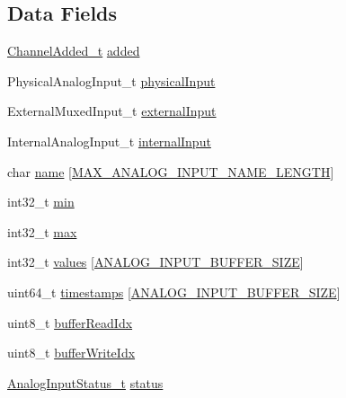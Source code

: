 \subsection*{Data Fields}
\begin{DoxyCompactItemize}
\item 
\hyperlink{group__board__channel__constants_gab0f30599ceb99e5ba3b2908d8e9bd131}{Channel\-Added\-\_\-t} \hyperlink{struct_analog___input__t_a6f1a4402ff8651dfc5e453b5e3154c2d}{added}
\item 
Physical\-Analog\-Input\-\_\-t \hyperlink{struct_analog___input__t_a56b9dddfb002a9709f8591dd04c06db8}{physical\-Input}
\item 
External\-Muxed\-Input\-\_\-t \hyperlink{struct_analog___input__t_abb199000d1f8af50de782aecf1f42108}{external\-Input}
\item 
Internal\-Analog\-Input\-\_\-t \hyperlink{struct_analog___input__t_a6a742e7de15fa168a904238051ba025e}{internal\-Input}
\item 
char \hyperlink{struct_analog___input__t_a3a0b07d12d70fc1006109b23512b61fb}{name} \mbox{[}\hyperlink{group__analog__input_ga7b523129daacaeca69045b3adb1aaf54}{M\-A\-X\-\_\-\-A\-N\-A\-L\-O\-G\-\_\-\-I\-N\-P\-U\-T\-\_\-\-N\-A\-M\-E\-\_\-\-L\-E\-N\-G\-T\-H}\mbox{]}
\item 
int32\-\_\-t \hyperlink{struct_analog___input__t_a0022b5ad7e496a802c64e3f6e0c2d8e1}{min}
\item 
int32\-\_\-t \hyperlink{struct_analog___input__t_accad1cdcd73e714badc388c3471bf33b}{max}
\item 
int32\-\_\-t \hyperlink{struct_analog___input__t_a5ec27e6ddaf65a4b494422578b93b246}{values} \mbox{[}\hyperlink{group__analog__input_ga3f128795c69a685d5e905c4117008271}{A\-N\-A\-L\-O\-G\-\_\-\-I\-N\-P\-U\-T\-\_\-\-B\-U\-F\-F\-E\-R\-\_\-\-S\-I\-Z\-E}\mbox{]}
\item 
uint64\-\_\-t \hyperlink{struct_analog___input__t_a611ead9e1d73ef2c8cac3f7cc95b0c17}{timestamps} \mbox{[}\hyperlink{group__analog__input_ga3f128795c69a685d5e905c4117008271}{A\-N\-A\-L\-O\-G\-\_\-\-I\-N\-P\-U\-T\-\_\-\-B\-U\-F\-F\-E\-R\-\_\-\-S\-I\-Z\-E}\mbox{]}
\item 
uint8\-\_\-t \hyperlink{struct_analog___input__t_ab88d160dc09c608f10a13c1b4cc06885}{buffer\-Read\-Idx}
\item 
uint8\-\_\-t \hyperlink{struct_analog___input__t_af6dc1e03b08d833bcad0d2a9ddacb9b2}{buffer\-Write\-Idx}
\item 
\hyperlink{group__analog__input_ga99258f91accf55ecea49707692a3889b}{Analog\-Input\-Status\-\_\-t} \hyperlink{struct_analog___input__t_ad008fd04a92bd503317246b84bedf3bc}{status}

\end{DoxyCompactItemize}
